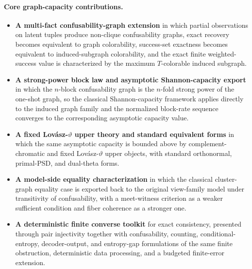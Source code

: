 \paragraph{Core graph-capacity contributions.}
\begin{itemize}
\tightlist
\item \textbf{A multi-fact confusability-graph extension} in which partial observations on latent tuples produce non-clique confusability graphs, exact recovery becomes equivalent to graph colorability, success-set exactness becomes equivalent to induced-subgraph colorability, and the exact finite weighted-success value is characterized by the maximum $T$-colorable induced subgraph.
\item \textbf{A strong-power block law and asymptotic Shannon-capacity export} in which the $n$-block confusability graph is the $n$-fold strong power of the one-shot graph, so the classical Shannon-capacity framework applies directly to the induced graph family and the normalized block-rate sequence converges to the corresponding asymptotic capacity value.
\item \textbf{A fixed Lov\'asz-$\vartheta$ upper theory and standard equivalent forms} in which the same asymptotic capacity is bounded above by complement-chromatic and fixed Lov\'asz-$\vartheta$ upper objects, with standard orthonormal, primal-PSD, and dual-theta forms.
\item \textbf{A model-side equality characterization} in which the classical cluster-graph equality case is exported back to the original view-family model under transitivity of confusability, with a meet-witness criterion as a weaker sufficient condition and fiber coherence as a stronger one.
\item \textbf{A deterministic finite converse toolkit} for exact consistency, presented through pair injectivity together with confusability, counting, conditional-entropy, decoder-output, and entropy-gap formulations of the same finite obstruction, deterministic data processing, and a budgeted finite-error extension.
\end{itemize}

